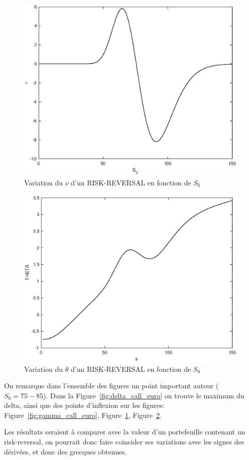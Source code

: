 \begin{figure}[H]
\centering
\includegraphics[scale=0.6]{./img/VEGA_S0.eps}
\caption{Variation du $\nu$ d'un RISK-REVERSAL en fonction de $S_0$}
\label{fig:vega_call_euro}
\end{figure}


\begin{figure}[H]
\centering
\includegraphics[scale=0.6]{./img/THETA_S0.eps}
\caption{Variation du $\theta$ d'un RISK-REVERSAL en fonction de $S_0$}
\label{fig:theta_call_euro}
\end{figure}

On remarque dans l'ensemble des figures un point important autour ($S_{0}= 75-85$). Dans la Figure~\ref{fig:delta_call_euro}  on trouve le maximum du delta, ainsi que des points d'inflexion sur les figures: Figure~\ref{fig:gamma_call_euro}, Figure~\ref{fig:vega_call_euro}, Figure~\ref{fig:theta_call_euro}.

Les résultats seraient à comparer avec la valeur d'un portefeuille contenant un risk-reversal, on pourrait donc faire coincider ses variations avec les signes des dérivées, et donc des grecques obtenues.